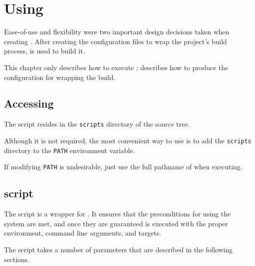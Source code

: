 %
%
%
%
\chapter{Using \lmsbw}

Ease-of-use and flexibility were two important design decisions taken
when creating \lmsbw.  After creating the configuration files to wrap
the project's build process, \lmsbwcmd is used to build it.

This chapter only describes how to execute \lmsbwcmd;
 describes how to produce the configuration for
wrapping the build.

\section{Accessing \lmsbwcmd}

The \lmsbwcmd script resides in the \texttt{scripts} directory of the
\lmsbw source tree.

Although it is not required, the most convenient way to use \lmsbwcmd
is to add the \texttt{scripts} directory to the \texttt{PATH}
environment variable.

If modifying \texttt{PATH} is undesirable, just use the full pathname
of \lmsbwcmd when executing.

\section{\lmsbwcmd script}

The \lmsbwcmd script is a wrapper for \make.  It ensures that the
preconditions for using the \lmsbw system are met, and once they are
guaranteed \make is executed with the proper environment, command line
arguments, and targets.

The \lmsbwcmd script takes a number of parameters that are described
in the following sections.


